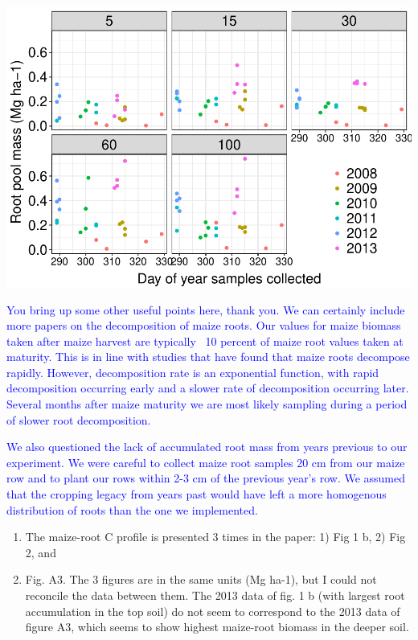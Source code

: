 \documentclass[]{article}
\providecommand{\tightlist}{%
  \setlength{\itemsep}{0pt}\setlength{\parskip}{0pt}}
\begin{document}
\includegraphics{Response_to_reviewers_files/figure-latex/sampling time-1.pdf}

\textcolor{blue}{You bring up some other useful points here, thank you. We can certainly include more papers on the decomposition of maize roots. Our values for maize biomass taken after maize harvest are typically ~10 percent of maize root values taken at maturity. This is in line with studies that have found that maize roots decompose rapidly. However, decomposition rate is an exponential function, with rapid decomposition occurring early and a slower rate of decomposition occurring later. Several months after maize maturity we are most likely sampling during a period of slower root decomposition.}

\textcolor{blue}{We also questioned the lack of accumulated root mass from years previous to our experiment. We were careful to collect maize root samples 20 cm from our maize row and to plant our rows within 2-3 cm of the previous year's row. We assumed that the cropping legacy from years past would have left a more homogenous distribution of roots than the one we implemented.}

\begin{enumerate}
\def\labelenumi{\arabic{enumi})}
\setcounter{enumi}{1}
\tightlist
\item
  The maize-root C profile is presented 3 times in the paper: 1) Fig 1
  b, 2) Fig 2, and
\item
  Fig. A3. The 3 figures are in the same units (Mg ha-1), but I could
  not reconcile the data between them. The 2013 data of fig. 1 b (with
  largest root accumulation in the top soil) do not seem to correspond
  to the 2013 data of figure A3, which seems to show highest maize-root
  biomass in the deeper soil.
\end{enumerate}
\end{document}
